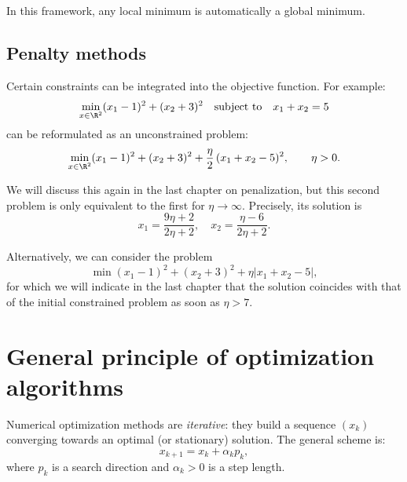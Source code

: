 In this framework, any local minimum is automatically a global minimum.

\subsection{Penalty methods}

Certain constraints can be integrated into the objective function.  
For example:
\[
\min_{x\in\R^2} (x_1-1)^2+(x_2+3)^2\quad\text{subject to}\quad x_1+x_2=5
\]
can be reformulated as an unconstrained problem:
\[
\min_{x\in\R^2} (x_1-1)^2+(x_2+3)^2
+ \frac{\eta}{2}\,(x_1+x_2-5)^2, \qquad \eta>0.
\]

We will discuss this again in the last chapter on penalization, but this second problem is only equivalent to the first for $\eta\to\infty$. Precisely, its solution is 
\[
x_1 = \frac{9\eta +2}{2\eta +2}, \quad x_2 = \frac{\eta - 6}{2\eta + 2}.
\]

Alternatively, we can consider the problem 
\[
\min (x_1-1)^2 + (x_2+3)^2 +\eta |x_1+x_2 -5|,
\] 
for which we will indicate in the last chapter that the solution coincides with that of the initial constrained problem as soon as $\eta > 7$.

\section{General principle of optimization algorithms}

Numerical optimization methods are \emph{iterative}: they build a sequence
$(x_k)$ converging towards an optimal (or stationary) solution. The general scheme is:
\[
x_{k+1}=x_k+\alpha_k p_k,
\]
where $p_k$ is a search direction and $\alpha_k>0$ is a step length.

\begin{center}
\end{center}

